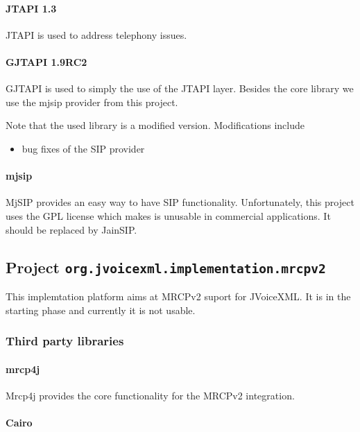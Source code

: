 \documentclass[11pt,a4paper]{article}
\begin{document}
\paragraph{JTAPI 1.3}

JTAPI is used to address telephony issues.

\paragraph{GJTAPI 1.9RC2}

GJTAPI is used to simply the use of the JTAPI layer. Besides the core library
we use the mjsip provider from this project.

Note that the used library is a modified version. Modifications include
\begin{itemize}
\item bug fixes of the SIP provider
\end{itemize}

\paragraph{mjsip}

MjSIP provides an easy way to have SIP functionality. Unfortunately, this
project uses the GPL license which makes is unusable in commercial
applications. It should be replaced by JainSIP.

\subsection{Project \lstinline{org.jvoicexml.implementation.mrcpv2}}

This implemtation platform aims at MRCPv2 suport for JVoiceXML. It is in the
starting phase and currently it is not usable.

\subsubsection{Third party libraries}
\label{sec:mrcpv2-third-party-libr}

\paragraph{mrcp4j}

Mrcp4j provides the core functionality for the MRCPv2 integration.

\paragraph{Cairo}
\end{document}
